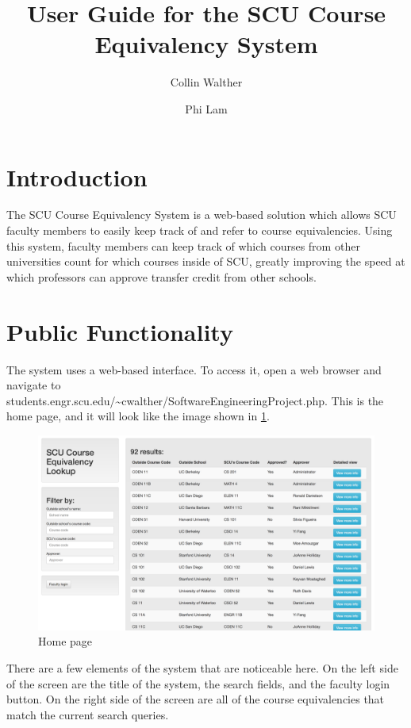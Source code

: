\documentclass{article}
\author{Collin Walther \and Phi Lam}
\title{User Guide for the SCU Course Equivalency System}
\begin{document}
\maketitle

\section{Introduction}
The SCU Course Equivalency System is a web-based solution which allows SCU
faculty members to easily keep track of and refer to course equivalencies.
Using this system, faculty members can keep track of which courses from other
universities count for which courses inside of SCU, greatly improving the speed
at which professors can approve transfer credit from other schools.

\section{Public Functionality}
\par The system uses a web-based interface. To access it, open a web browser
and navigate to \\students.engr.scu.edu/\textasciitilde cwalther/SoftwareEngineeringProject.php.
This is the home page, and it will look like the
image shown in \cref{fig:homepage}.

\begin{figure}[h]
\includegraphics[width=15cm]{homepage}
\centering
\caption{Home page}
\label{fig:homepage}
\end{figure}

\par There are a few elements of the system that are noticeable here. On the
left side of the screen are the title of the system, the search fields, and
the faculty login button. On the right side of the screen are all of the
course equivalencies that match the current search queries.
\end{document}
